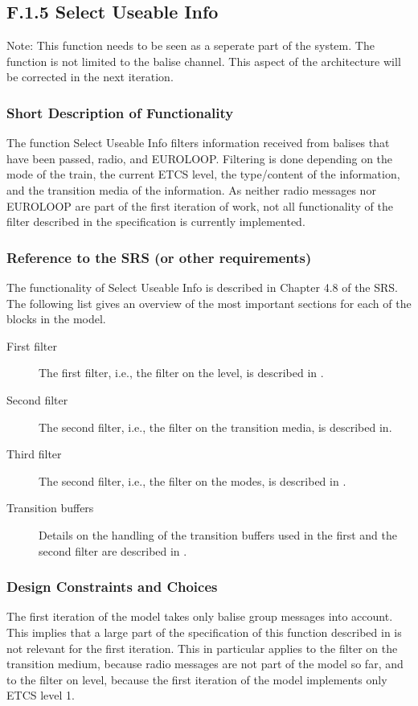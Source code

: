 \documentclass{template/openetcs_report}
\begin{document}
\subsection{F.1.5 Select Useable Info}
Note: This function needs to be seen as a seperate part of the system. The function is not limited to the balise channel.
This aspect of the architecture will be corrected in the next iteration.

\subsubsection{Short Description of Functionality}
The function Select Useable Info filters information received from balises that have been passed, radio, and EUROLOOP. Filtering is done depending on the mode of the train, the current ETCS level, the type/content of the information, and the transition media of the information. As neither radio messages nor EUROLOOP are part of the first iteration of work, not all functionality of the filter described in the specification is currently implemented.

\subsubsection{Reference to the SRS (or other requirements)}
The functionality of Select Useable Info is described in Chapter 4.8 of the SRS. The following list gives an overview of the most important sections for each of the blocks in the model.

\begin{description}
\item[First filter] The first filter, i.e., the filter on the level, is described in \cite[Chapter~4.8.3]{subset-026}.
\item[Second filter] The second filter, i.e., the filter on the transition media, is described in\cite[Chapter~4.8.3]{subset-026}.
\item[Third filter]
 The second filter, i.e., the filter on the modes, is described in \cite[Chapter~4.8.4]{subset-026}.
\item[Transition buffers] Details on the handling of the transition buffers used in the first and the second filter are described in \cite[Chapter~4.8.5]{subset-026}.
\end{description}

\subsubsection{Design Constraints and Choices}
The first iteration of the model takes only balise group messages into account. This implies that a large part of the specification of this function described in \cite{subset-026} is not relevant for the first iteration. This in particular applies to the filter on the transition medium, because radio messages are not part of the model so far, and to the filter on level, because the first iteration of the model implements only ETCS level 1.
\end{document}
